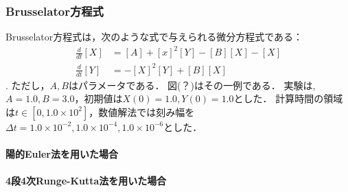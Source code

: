 \subsubsection{Brusselator方程式}
Brusselator方程式は，次のような式で与えられる微分方程式である：
\begin{align}
    \frac{d}{dt}[X] &= [A] + [x]^2[Y] - [B][X] - [X]\\
    \frac{d}{dt}[Y] &= -[X]^2[Y] + [B][X]
\end{align}.
ただし，$A,B$はパラメータである．
図(？)はその一例である．
実験は,$A=1.0, B=3.0$，初期値は$X(0) = 1.0, Y(0) = 1.0$とした．
計算時間の領域は$t \in [0,1.0 \times 10^2]$，数値解法では刻み幅を$\Delta t =  1.0 \times 10^{-2},1.0 \times 10^{-4}, 1.0 \times 10^{-6}$とした．
\paragraph*{陽的Euler法を用いた場合}

\paragraph*{4段4次Runge-Kutta法を用いた場合}


